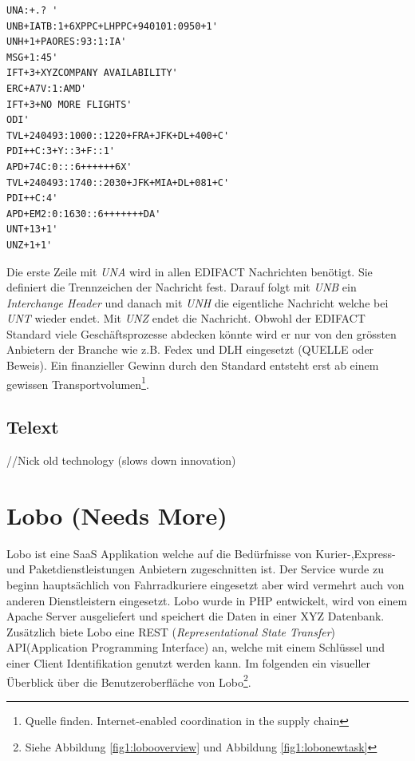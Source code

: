 \begin{verbatim}
UNA:+.? '
UNB+IATB:1+6XPPC+LHPPC+940101:0950+1'
UNH+1+PAORES:93:1:IA'
MSG+1:45'
IFT+3+XYZCOMPANY AVAILABILITY'
ERC+A7V:1:AMD'
IFT+3+NO MORE FLIGHTS'
ODI'
TVL+240493:1000::1220+FRA+JFK+DL+400+C'
PDI++C:3+Y::3+F::1'
APD+74C:0:::6++++++6X'
TVL+240493:1740::2030+JFK+MIA+DL+081+C'
PDI++C:4'
APD+EM2:0:1630::6+++++++DA'
UNT+13+1'
UNZ+1+1'
\end{verbatim}
Die erste Zeile mit \textit{UNA} wird in allen EDIFACT Nachrichten benötigt. Sie definiert die Trennzeichen der Nachricht fest. Darauf folgt mit \textit{UNB} ein \textit{Interchange Header} und danach mit \textit{UNH} die eigentliche Nachricht welche bei \textit{UNT} wieder endet. Mit \textit{UNZ} endet die Nachricht.
\newline{}
Obwohl der EDIFACT Standard viele Geschäftsprozesse abdecken könnte wird er nur von den grössten Anbietern der Branche wie z.B. Fedex und DLH eingesetzt (QUELLE oder Beweis). Ein finanzieller Gewinn durch den Standard entsteht erst ab einem gewissen Transportvolumen\footnote{Quelle finden. Internet-enabled coordination in the supply chain}.

\subsection{Telext}
//Nick old technology (slows down innovation)


\section{Lobo (Needs More)}
Lobo ist eine SaaS Applikation welche auf die Bedürfnisse von Kurier-,Express- und Paketdienstleistungen Anbietern zugeschnitten ist. Der Service wurde zu beginn hauptsächlich von Fahrradkuriere eingesetzt aber wird vermehrt auch von anderen Dienstleistern eingesetzt. Lobo wurde in PHP entwickelt, wird von einem Apache Server ausgeliefert und speichert die Daten in einer XYZ Datenbank. Zusätzlich biete Lobo eine REST (\textit{Representational State Transfer}) API(Application Programming Interface) an, welche mit einem Schlüssel und einer Client Identifikation genutzt werden kann. Im folgenden ein visueller Überblick über die Benutzeroberfläche von Lobo\footnote{Siehe Abbildung \ref{fig1:lobooverview} und Abbildung \ref{fig1:lobonewtask}}.

